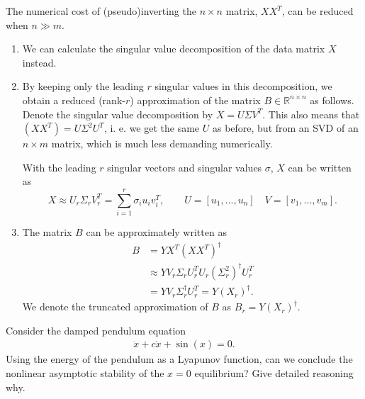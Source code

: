 \begin{remark}[]
The numerical cost of (pseudo)inverting the $n \times n$ matrix, $XX^T$, can be reduced when $n\gg m$.
\begin{enumerate}
\item We can calculate the singular value decomposition of the data matrix $X$ instead. 
\item By keeping only the leading $r$ singular values in this decomposition, we obtain a reduced (rank-$r$) approximation of the matrix $B\in \mathbb{R}^{n \times n}$ as follows. Denote the singular value decomposition by $X = U\Sigma V^T$.  This also means that $(XX^T) = U\Sigma^2 U^T$, i. e. we get the same $U$ as before, but from an SVD of an $n\times m$ matrix, which is much less demanding numerically.

 With the leading $r$ singular vectors and singular values $\sigma$, $X$ can be written as
\begin{equation}
X \approx U_r \Sigma_r V_r^T = \sum_{i=1}^r \sigma_i u_i v_i^T, \qquad U = [u_1, ..., u_n]\quad V = [v_1, ..., v_m].
\end{equation}
\item The matrix $B$ can be approximately written as 
	\begin{subequations}
\begin{align}
B &= YX^T(XX^T)^\dagger \\
& \approx YV_r\Sigma_rU_r^TU_r(\Sigma_r^2)^\dagger U_r^T \\
&= YV_r\Sigma_r^\dagger U_r^T = Y(X_r)^\dagger.
\end{align}\end{subequations}
We denote the truncated approximation of $B$ as $B_r = Y (X_r)^\dagger.$
\end{enumerate}
\end{remark}
	
	
\begin{exercise}
Consider the damped pendulum equation
\begin{align}
	\ddot{x} + c\dot{x} + \sin(x) = 0.
\end{align}
Using the energy of the pendulum as a Lyapunov function, can we conclude the nonlinear asymptotic stability of the $x=0$ equilibrium? Give detailed reasoning why.
\end{exercise}
	
